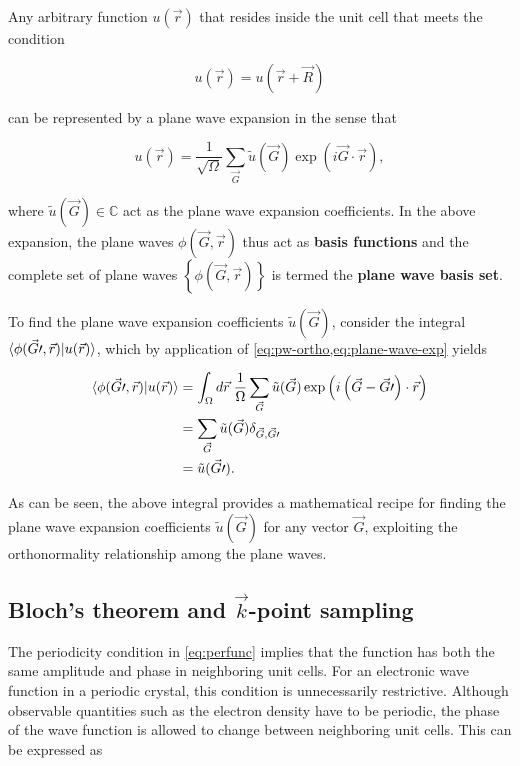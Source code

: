 Any arbitrary function $u(\vec{r})$ that resides inside the unit cell that meets the condition

\begin{equation}
    u(\vec{r}) = u(\vec{r} + \vec{R}) \label{eq:perfunc}
\end{equation}

can be represented by a plane wave expansion in the sense that

\begin{equation}
    u(\vec{r}) = \frac{1}{\sqrt{\Omega}} \sum_{\vec{G}} \tilde{u}(\vec{G}) \exp \left(i \vec{G} \cdot \vec{r} \right), \label{eq:plane-wave-exp}
\end{equation}

where $\tilde{u}(\vec{G}) \in \mathbb{C}$ act as the plane wave expansion coefficients. In the above expansion, the plane waves $\phi(\vec{G},\vec{r})$ thus act as \textbf{basis functions} and the complete set of plane waves $\left\{ \phi(\vec{G},\vec{r}) \right\}$ is termed the \textbf{plane wave basis set}.

To find the plane wave expansion coefficients $\tilde{u}(\vec{G})$, consider the integral $\braket{\phi(\vec{G}\prime,\vec{r}) | u(\vec{r})}$, which by application of \cref{eq:pw-ortho,eq:plane-wave-exp} yields

\begin{align}
    \braket{\phi(\vec{G}\prime,\vec{r}) | u(\vec{r})} &= \int_{\Omega} d\vec{r} \; \frac{1}{\Omega} \sum_{\vec{G}} \tilde{u}(\vec{G}) \exp \left(i \left(\vec{G} - \vec{G}\prime\right) \cdot \vec{r} \right) \label{eq:pwcoeff-int} \\
    &= \sum_{\vec{G}} \tilde{u}(\vec{G}) \delta_{\vec{G},\vec{G}\prime} \\
    &= \tilde{u}(\vec{G}\prime).
\end{align}

As can be seen, the above integral provides a mathematical recipe for finding the plane wave expansion coefficients $\tilde{u}(\vec{G})$ for any vector $\vec{G}$, exploiting the orthonormality relationship among the plane waves.

%
%
%
\subsection{Bloch's theorem and $\vec{k}$-point sampling}

The periodicity condition in \cref{eq:perfunc} implies that the function has both the same amplitude and phase in neighboring unit cells. For an electronic wave function in a periodic crystal, this condition is unnecessarily restrictive. Although observable quantities such as the electron density have to be periodic, the phase of the wave function is allowed to change between neighboring unit cells. This can be expressed as

